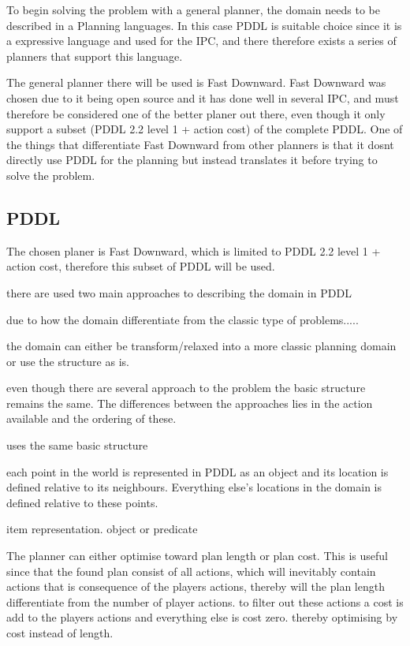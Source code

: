 	To begin solving the problem with a general planner, the domain needs to be described in a Planning languages. In this case PDDL is suitable choice since it is a expressive language and used for the IPC, and there therefore exists a series of planners that support this language.
 

	  
	
	The general planner there will be used is Fast Downward. Fast Downward was chosen due to it being open source and it has done well in several IPC, and must therefore be considered one of the better planer out there, even though it only support a subset (PDDL 2.2 level 1 + action cost) of the complete PDDL.
	One of the things that differentiate Fast Downward from other planners is that it dosnt directly use PDDL for the planning but instead translates it before trying to solve the problem. 
 
 \subsection{PDDL}
	The chosen planer is Fast Downward, which is limited to PDDL 2.2 level 1 + action cost, therefore this subset of PDDL will be used.


	
	there are used two main approaches to describing the domain in PDDL
		
	due to how the domain differentiate from the classic type of problems.....
	
	the domain can either be transform/relaxed into a more classic planning domain or use the structure as is.
	
		even though there are several approach to the problem the basic structure remains the same. The differences between the approaches lies in the action available and the ordering of these. 
		
		uses the same basic structure
		
		each point in the world is represented in PDDL as an object and its location is defined relative to its neighbours. Everything else's locations in the domain is defined relative to these points.
		
		item representation. object or predicate

		
		
		The planner can either optimise toward plan length or plan cost. This is useful since that the found plan consist of all actions, which will inevitably contain actions that is consequence of the players actions, thereby will the plan length differentiate from the number of player actions. to filter out these actions a cost is add to the players actions and everything else is cost zero. thereby optimising by cost instead of length.
	
